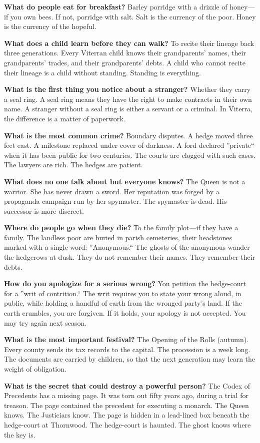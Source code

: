 \begin{almanac}
\textbf{What do people eat for breakfast?} Barley porridge with a drizzle of honey---if you own bees. If not, porridge with salt. Salt is the currency of the poor. Honey is the currency of the hopeful.

\textbf{What does a child learn before they can walk?} To recite their lineage back three generations. Every Viterran child knows their grandparents' names, their grandparents' trades, and their grandparents' debts. A child who cannot recite their lineage is a child without standing. Standing is everything.

\textbf{What is the first thing you notice about a stranger?} Whether they carry a seal ring. A seal ring means they have the right to make contracts in their own name. A stranger without a seal ring is either a servant or a criminal. In Viterra, the difference is a matter of paperwork.

\textbf{What is the most common crime?} Boundary disputes. A hedge moved three feet east. A milestone replaced under cover of darkness. A ford declared ''private`` when it has been public for two centuries. The courts are clogged with such cases. The lawyers are rich. The hedges are patient.

\textbf{What does no one talk about but everyone knows?} The Queen is not a warrior. She has never drawn a sword. Her reputation was forged by a propaganda campaign run by her spymaster. The spymaster is dead. His successor is more discreet.

\textbf{Where do people go when they die?} To the family plot---if they have a family. The landless poor are buried in parish cemeteries, their headstones marked with a single word: ''Anonymous.`` The ghosts of the anonymous wander the hedgerows at dusk. They do not remember their names. They remember their debts.

\textbf{How do you apologize for a serious wrong?} You petition the hedge-court for a ''writ of contrition.`` The writ requires you to state your wrong aloud, in public, while holding a handful of earth from the wronged party's land. If the earth crumbles, you are forgiven. If it holds, your apology is not accepted. You may try again next season.

\textbf{What is the most important festival?} The Opening of the Rolls (autumn). Every county sends its tax records to the capital. The procession is a week long. The documents are carried by children, so that the next generation may learn the weight of obligation.

\textbf{What is the secret that could destroy a powerful person?} The Codex of Precedents has a missing page. It was torn out fifty years ago, during a trial for treason. The page contained the precedent for executing a monarch. The Queen knows. The Justiciars know. The page is hidden in a lead-lined box beneath the hedge-court at Thornwood. The hedge-court is haunted. The ghost knows where the key is.
\end{almanac}

